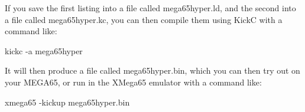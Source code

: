 If you save the first listing into a file called mega65hyper.ld, and the second
into a file called mega65hyper.kc, you can then compile them using KickC with
a command like:

\begin{screenoutput}
  kickc -a mega65hyper
\end{screenoutput}

It will then produce a file called mega65hyper.bin, which you can then try out
on your MEGA65, or run in the XMega65 emulator with a command like:

\begin{screenoutput}
  xmega65 -kickup mega65hyper.bin
\end{screenoutput}
